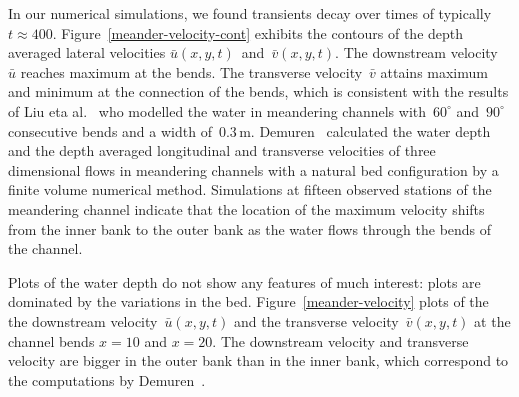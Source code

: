 \documentclass[a5paper,12pt]{article}
\newcommand{\uu}{{\bar u}}
\newcommand{\vv}{{\bar v}}
\begin{document}

In our numerical simulations, we found transients decay over times of typically \(t\approx400\).
Figure~\ref{meander-velocity-cont} exhibits the contours of the depth averaged lateral velocities $\uu(x,y,t)$~and~$\vv(x,y,t)$. 
The downstream velocity~$\uu$ reaches maximum at the bends.
The transverse velocity~$\vv$ attains maximum and minimum at the connection of the bends, which is consistent with the results of Liu eta al.~\cite{Liu2009} who modelled the water in meandering channels with~$60^\circ$ and~$90^\circ$ consecutive bends and a width of~$0.3$\,m.
Demuren~\cite{Demuren1993} calculated the water depth and the depth averaged longitudinal and transverse velocities of three dimensional flows in meandering channels with a natural bed configuration by a finite volume numerical method. 
Simulations at fifteen observed stations of the meandering channel indicate that the location of the maximum velocity shifts from the inner bank to the outer bank as the water flows through the bends of the channel. 

Plots of the water depth do not show any features of much interest: plots are dominated by the variations in the bed.
Figure~\ref{meander-velocity} plots of the the downstream velocity~$\uu(x,y,t)$ and the transverse velocity~$\vv(x,y,t)$ at the channel bends $x=10$ and $x=20$.
The downstream velocity and transverse velocity are bigger in the outer bank than in the inner bank, which correspond to the computations by Demuren~\cite{Demuren1993}. 
\end{document}
